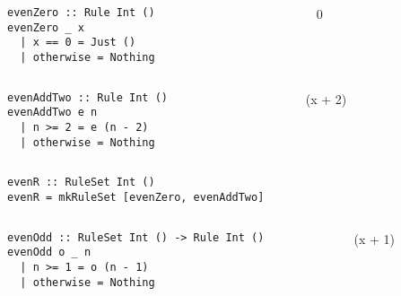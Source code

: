 \begin{frame}[fragile]
  \begin{columns}
    \begin{column}{0.5\textwidth}
      \begin{verbatim}
evenZero :: Rule Int ()
evenZero _ x
  | x == 0 = Just ()
  | otherwise = Nothing
      \end{verbatim}
    \end{column}
    \begin{column}{0.5\textwidth}
          {~0}
    \end{column}
  \end{columns}
\end{frame}

\begin{frame}[fragile]
  \begin{columns}
    \begin{column}{0.5\textwidth}
      \begin{verbatim}
evenAddTwo :: Rule Int ()
evenAddTwo e n
  | n >= 2 = e (n - 2)
  | otherwise = Nothing
      \end{verbatim}
    \end{column}
    \begin{column}{0.5\textwidth}
          {~\left(x + 2\right)}
    \end{column}
  \end{columns}
\end{frame}

\begin{frame}[fragile]
  \begin{verbatim}
evenR :: RuleSet Int ()
evenR = mkRuleSet [evenZero, evenAddTwo]
  \end{verbatim}
\end{frame}

\begin{frame}[fragile,c]
  \begin{columns}
    \begin{column}{0.5\textwidth}
  \begin{verbatim}
evenOdd :: RuleSet Int () -> Rule Int ()
evenOdd o _ n
  | n >= 1 = o (n - 1)
  | otherwise = Nothing
  \end{verbatim}
    \end{column}
    \begin{column}{0.5\textwidth}
          {~\left(x + 1\right)}
    \end{column}
  \end{columns}
\end{frame}

